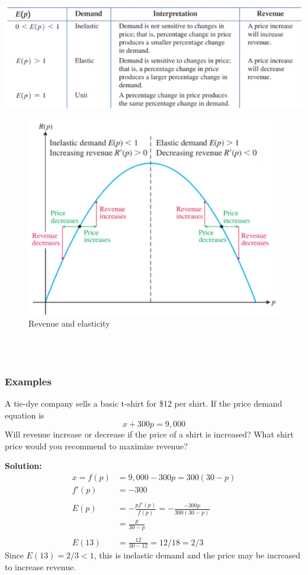 \documentclass[14pt]{extarticle}
\begin{document}
\includegraphics[width=1.0\linewidth]{10-7-1}
\\
\begin{figure}[h!]
	\caption{Revenue and elasticity}
	\includegraphics[width=0.8\linewidth]{10-7-2}
\end{figure}
\\ \\

\subsubsection{Examples}
A tie-dye company sells a basic t-shirt for \$12 per shirt. If the price demand equation is
$$x+300p = 9,000$$
Will revenue increase or decrease if the price of a shirt is increased? What shirt price would you recommend to maximize revenue?

\textbf{Solution:}
\begin{align*}
	x = f(p) &= 9,000 -300p = 300(30 -p) \\
	f'(p) &= -300 \\\\
	E(p) &= -\frac{pf'(p)}{f(p)} = -\frac{-300p}{300(30-p)}\\
	&= \frac{p}{30-p} \\\\
	E(13) &= \frac{12}{30-12} = 12/18 = 2/3
\end{align*}
Since $E(13) = 2/3 < 1$, this is inelastic demand and the price may be increased to increase revenue.
\end{document}
